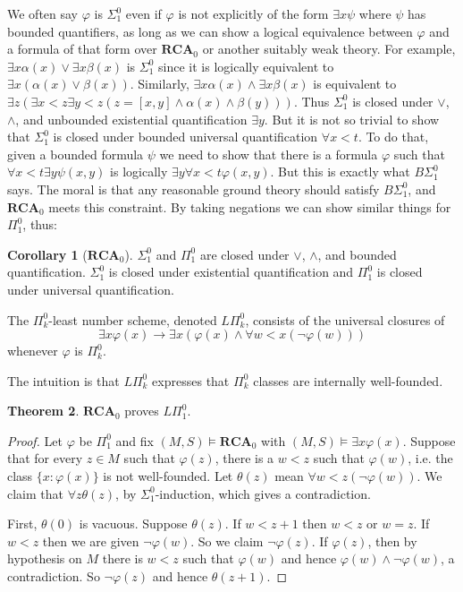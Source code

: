 \documentclass[12pt]{book}
\newcommand{\RCA}{\mathbf{RCA}}
\theoremstyle{definition}
\newtheorem{theorem}{Theorem}[chapter]
\newtheorem{corollary}[theorem]{Corollary}
\newenvironment{definition}
  {\pushQED{\qed}\renewcommand{\qedsymbol}{$\diamondsuit$}\definitionx}
  {\popQED\endexamplex}
\begin{document}
We often say $\varphi$ is $\Sigma_1^0$ even if $\varphi$ is not explicitly of the form $\exists x \psi$ where $\psi$ has bounded quantifiers, as long as we can show a logical equivalence between $\varphi$ and a formula of that form over $\RCA_0$ or another suitably weak theory.
For example, $\exists x \alpha(x) \vee \exists x \beta(x)$ is $\Sigma_1^0$ since it is logically equivalent to $\exists x(\alpha(x) \vee \beta(x))$.
Similarly, $\exists x \alpha(x) \wedge \exists x \beta(x)$ is equivalent to $\exists z(\exists x < z \exists y < z(z = [x, y] \wedge \alpha(x) \wedge \beta(y)))$.
Thus $\Sigma_1^0$ is closed under $\vee$, $\wedge$, and unbounded existential quantification $\exists y$.
But it is not so trivial to show that $\Sigma_1^0$ is closed under bounded universal quantification $\forall x < t$.
To do that, given a bounded formula $\psi$ we need to show that there is a formula $\varphi$ such that $\forall x < t \exists y \psi(x, y)$ is logically $\exists y \forall x < t \varphi(x, y)$.
But this is exactly what $B\Sigma_1^0$ says.
The moral is that any reasonable ground theory should satisfy $B\Sigma_1^0$, and $\RCA_0$ meets this constraint.
By taking negations we can show similar things for $\Pi_1^0$, thus:

\begin{corollary}[$\RCA_0$]
$\Sigma_1^0$ and $\Pi_1^0$ are closed under $\vee$, $\wedge$, and bounded quantification.
$\Sigma_1^0$ is closed under existential quantification and $\Pi_1^0$ is closed under universal quantification.
\end{corollary}

\begin{definition}
The $\Pi_k^0$-least number scheme, denoted $L\Pi_k^0$, consists of the universal closures of
$$\exists x \varphi(x) \to \exists x(\varphi(x) \wedge \forall w < x(\neg \varphi(w)))$$
whenever $\varphi$ is $\Pi_k^0$.
\end{definition}

The intuition is that $L\Pi_k^0$ expresses that $\Pi_k^0$ classes are internally well-founded.

\begin{theorem}
$\RCA_0$ proves $L\Pi_1^0$.
\end{theorem}
\begin{proof}
Let $\varphi$ be $\Pi_1^0$ and fix $(M, S) \models \RCA_0$ with $(M, S) \models \exists x \varphi(x)$.
Suppose that for every $z \in M$ such that $\varphi(z)$, there is a $w < z$ such that $\varphi(w)$, i.e. the class $\{x: \varphi(x)\}$ is not well-founded.
Let $\theta(z)$ mean $\forall w < z(\neg \varphi(w))$.
We claim that $\forall z \theta(z)$, by $\Sigma_1^0$-induction, which gives a contradiction.

First, $\theta(0)$ is vacuous. Suppose $\theta(z)$.
If $w < z + 1$ then $w < z$ or $w = z$. If $w < z$ then we are given $\neg \varphi(w)$.
So we claim $\neg \varphi(z)$.
If $\varphi(z)$, then by hypothesis on $M$ there is $w < z$ such that $\varphi(w)$ and hence $\varphi(w) \wedge \neg\varphi(w)$, a contradiction.
So $\neg \varphi(z)$ and hence $\theta(z + 1)$.
\end{proof}
\end{document}
